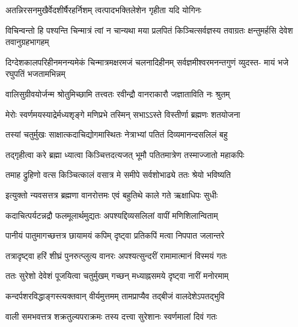 \twolineshloka
{अतन्निरसनमुखैर्वेदशीर्षैरहर्निशम्}
{त्वत्पादभक्तिलेशेन गृहीता यदि योगिनः} %

\threelineshloka
{विचिन्वन्तो हि पश्यन्ति चिन्मात्रं त्वां न चान्यथा}
{मया प्रलपितं किञ्चित्सर्वज्ञस्य तवाग्रतः}
{क्षन्तुमर्हसि देवेश तवानुग्रहभागहम्} %

\fourlineindentedshloka
{दिग्देशकालपरिहीनमनन्यमेकं}
{चिन्मात्रमक्षरमजं चलनादिहीनम्}
{सर्वज्ञमीश्वरमनन्तगुणं व्युदस्त-}
{मायं भजे रघुपतिं भजतामभिन्नम्} %






\twolineshloka
{वालिसुग्रीवयोर्जन्म श्रोतुमिच्छामि तत्त्वतः}
{रवीन्द्रौ वानराकारौ जज्ञाताविति नः श्रुतम्} %


\twolineshloka
{मेरोः स्वर्णमयस्याद्रेर्मध्यशृङ्गे मणिप्रभे}
{तस्मिन् सभाऽऽस्ते विस्तीर्णा ब्रह्मणः शतयोजना} %

\twolineshloka
{तस्यां चतुर्मुखः साक्षात्कदाचिद्योगमास्थितः}
{नेत्राभ्यां पतितं दिव्यमानन्दसलिलं बहु} %

\twolineshloka
{तद्गृहीत्वा करे ब्रह्मा ध्यात्वा किञ्चित्तदत्यजत्}
{भूमौ पतितमात्रेण तस्माज्जातो महाकपिः} %

\twolineshloka
{तमाह द्रुहिणो वत्स किञ्चित्कालं वसात्र मे}
{समीपे सर्वशोभाढ्ये ततः श्रेयो भविष्यति} %

\twolineshloka
{इत्युक्तो न्यवसत्तत्र ब्रह्मणा वानरोत्तमः}
{एवं बहुतिथे काले गते ऋक्षाधिपः सुधीः} %

\twolineshloka
{कदाचित्पर्यटन्नद्रौ फलमूलार्थमुद्यतः}
{अपश्यद्दिव्यसलिलां वापीं मणिशिलान्विताम्} %

\twolineshloka
{पानीयं पातुमागच्छत्तत्र छायामयं कपिम्}
{दृष्ट्वा प्रतिकपिं मत्वा निपपात जलान्तरे} %

\twolineshloka
{तत्रादृष्ट्वा हरिं शीघ्रं पुनरुत्प्लुत्य वानरः}
{अपश्यत्सुन्दरीं रामामात्मानं विस्मयं गतः} %

\twolineshloka
{ततः सुरेशो देवेशं पूजयित्वा चतुर्मुखम्}
{गच्छन् मध्याह्नसमये दृष्ट्वा नारीं मनोरमाम्} %

\twolineshloka
{कन्दर्पशरविद्धाङ्गस्त्यक्तवान् वीर्यमुत्तमम्}
{तामप्राप्यैव तद्बीजं वालदेशेऽपतद्भुवि} %

\twolineshloka
{वाली समभवत्तत्र शक्रतुल्यपराक्रमः}
{तस्य दत्त्वा सुरेशानः स्वर्णमालां दिवं गतः} %

